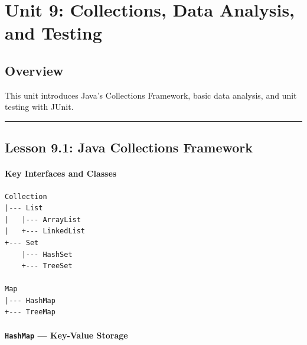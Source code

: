 \documentclass[
  justified,
  openright,
]{tufte-book}
\let\subsubsection\paragraph
\let\paragraph\paragraph
\let\subsubsection\paragraph
\let\paragraph\paragraph
\begin{document}
\newpage

\section{Unit 9: Collections, Data Analysis, and
Testing}\label{unit-9-collections-data-analysis-and-testing}

\subsection{Overview}\label{overview-9}

This unit introduces Java's Collections Framework, basic data analysis,
and unit testing with JUnit.

\begin{center}\rule{0.5\linewidth}{0.5pt}\end{center}

\subsection{Lesson 9.1: Java Collections
Framework}\label{lesson-9.1-java-collections-framework}

\subsubsection{Key Interfaces and
Classes}\label{key-interfaces-and-classes}

\begin{verbatim}
Collection
|--- List
|   |--- ArrayList
|   +--- LinkedList
+--- Set
    |--- HashSet
    +--- TreeSet

Map
|--- HashMap
+--- TreeMap
\end{verbatim}

\subsubsection{\texorpdfstring{\texttt{HashMap} --- Key-Value
Storage}{HashMap --- Key-Value Storage}}\label{hashmap-key-value-storage}
\end{document}
